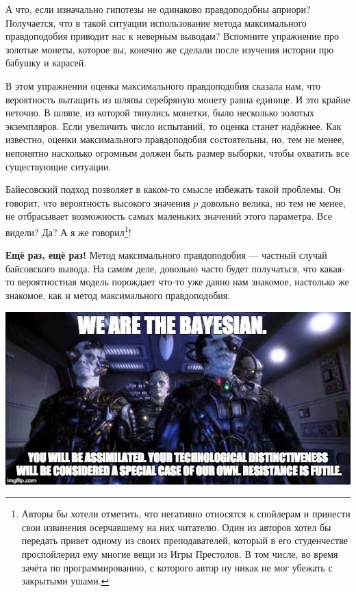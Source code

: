 \documentclass[12pt, a4paper, oneside]{extreport}
\theoremstyle{plain}              %
\theoremstyle{definition}         %
\begin{document}
А что, если изначально гипотезы не одинаково правдоподобны априори? Получается, что в такой ситуации использование метода максимального правдоподобия приводит нас к неверным выводам? Вспомните упражнение про золотые монеты, которое вы, конечно же сделали после изучения истории про бабушку и карасей.

В этом упражнении оценка максимального правдоподобия сказала нам, что вероятность вытащить из шляпы серебряную монету равна единице. И это крайне неточно. В шляпе, из которой тянулись монетки, было несколько золотых экземпляров. Если увеличить число испытаний, то оценка станет надёжнее. Как известно, оценки максимального правдоподобия состоятельны, но, тем не менее, непонятно насколько огромным должен быть размер выборки, чтобы охватить все существующие ситуации. 

Байесовский подход позволяет в каком-то смысле избежать такой проблемы. Он говорит, что вероятность высокого значения $p$ довольно велика, но тем не менее, не отбрасывает возможность самых маленьких значений этого параметра.  Все видели? Да? А я же говорил\footnote{Авторы бы хотели отметить, что негативно относятся к спойлерам и принести свои извинения осерчавшему на них читателю. Один из авторов хотел бы передать привет одному из своих преподавателей, который в его студенчестве проспойлерил ему многие вещи из Игры Престолов. В том числе, во время зачёта по программированию, с которого автор ну никак не мог убежать с закрытыми ушами.}!

\textbf{Ещё раз, ещё раз!} Метод максимального правдоподобия --- частный случай байсовского вывода. На самом деле, довольно часто будет получаться, что какая-то вероятностная модель порождает что-то уже давно нам знакомое, настолько же знакомое, как и метод максимального правдоподобия. 

\begin{center}
\includegraphics[scale=0.6]{bayesians.jpg}
\end{center} 
\end{document}

